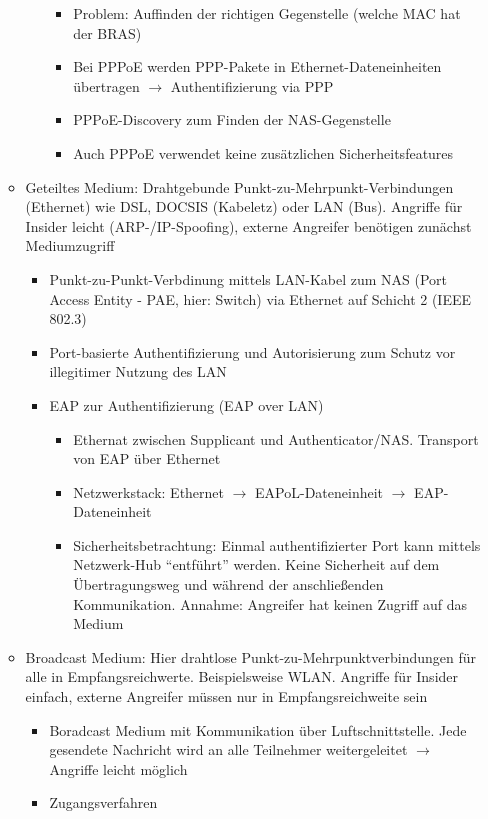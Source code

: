 \begin{itemize}
\begin{itemize}
\begin{itemize}
\begin{itemize}
				\item Problem: Auffinden der richtigen Gegenstelle (welche MAC hat der BRAS)
				\item Bei PPPoE werden PPP-Pakete in Ethernet-Dateneinheiten übertragen \(\rightarrow\) Authentifizierung via PPP
				\item PPPoE-Discovery zum Finden der NAS-Gegenstelle
				\item Auch PPPoE verwendet keine zusätzlichen Sicherheitsfeatures
			\end{itemize}
		\end{itemize}
		\item Geteiltes Medium: Drahtgebunde Punkt-zu-Mehrpunkt-Verbindungen (Ethernet) wie DSL, DOCSIS (Kabeletz) oder LAN (Bus). Angriffe für Insider leicht (ARP-/IP-Spoofing), externe Angreifer benötigen zunächst Mediumzugriff
		\begin{itemize}
			\item Punkt-zu-Punkt-Verbdinung mittels LAN-Kabel zum NAS (Port Access Entity - PAE, hier: Switch) via Ethernet auf Schicht 2 (IEEE 802.3)
			\item Port-basierte Authentifizierung und Autorisierung zum Schutz vor illegitimer Nutzung des LAN
			\item EAP zur Authentifizierung (EAP over LAN)
			\begin{itemize}
				\item Ethernat zwischen Supplicant und Authenticator/NAS. Transport von EAP über Ethernet
				\item Netzwerkstack: Ethernet \(\rightarrow\) EAPoL-Dateneinheit \(\rightarrow\) EAP-Dateneinheit
				\item Sicherheitsbetrachtung: Einmal authentifizierter Port kann mittels Netzwerk-Hub "`entführt"' werden. Keine Sicherheit auf dem Übertragungsweg und während der anschließenden Kommunikation. Annahme: Angreifer hat keinen Zugriff auf das Medium
			\end{itemize}
		\end{itemize}
		\item Broadcast Medium: Hier drahtlose Punkt-zu-Mehrpunktverbindungen für alle in Empfangsreichwerte. Beispielsweise WLAN. Angriffe für Insider einfach, externe Angreifer müssen nur in Empfangsreichweite sein
		\begin{itemize}
			\item Boradcast Medium mit Kommunikation über Luftschnittstelle. Jede gesendete Nachricht wird an alle Teilnehmer weitergeleitet \(\rightarrow\) Angriffe leicht möglich
			\item Zugangsverfahren

\end{itemize}
\end{itemize}
\end{itemize}
